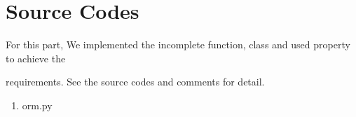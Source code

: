 \documentclass[letterpaper,10pt,english]{sphinxmanual}
\begin{document}
\section{Source Codes}
\label{\detokenize{index:source-codes}}
\begin{DUlineblock}{0em}
\item[]
\begin{DUlineblock}{\DUlineblockindent}
\item[] For this part, We implemented the incomplete function, class and used property to achieve the
\end{DUlineblock}
\item[] requirements. See the source codes and comments for detail.
\end{DUlineblock}
\begin{enumerate}
%
\item {} 
orm.py

\end{enumerate}
\end{document}
